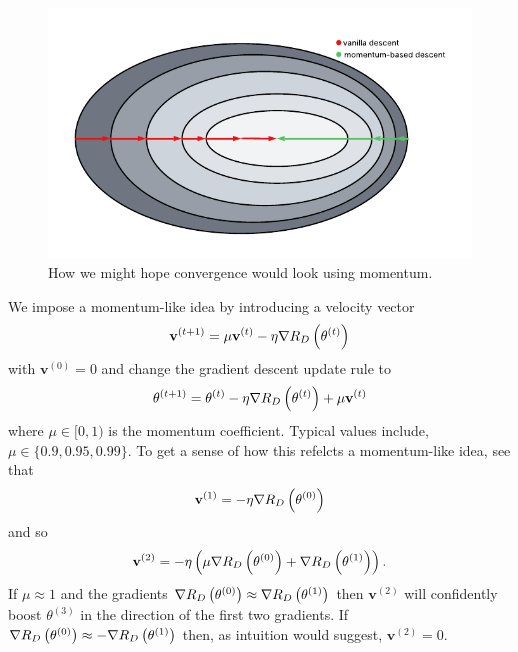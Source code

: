 \documentclass[11pt]{article}
\begin{document}
\begin{figure}[t]
    \centering
    \begin{minipage}{0.62\linewidth}
        \includegraphics[width=\columnwidth]{./figures/gradient_descent/momentum.pdf}
    \end{minipage}%
    \hfill
    \begin{minipage}{0.38\linewidth}
        \caption{How we might hope convergence would look using momentum.}
        \label{fig:gradient_descent_momentum}
    \end{minipage}
\end{figure}

We impose a momentum-like idea by introducing a velocity vector
$$
\mathbf{v}^{(t+1)}
=
\mu\mathbf{v}^{(t)}-\eta\nabla R_D\left(\theta^{(t)}\right)
$$
with $\mathbf{v}^{(0)}=0$ and change the gradient descent update rule to
$$
\theta^{(t+1)}
=
\theta^{(t)}-\eta\nabla R_D\left(\theta^{(t)}\right)+\mu\mathbf{v}^{(t)}
$$
where $\mu\in[0,1)$ is the momentum coefficient. Typical values include, $\mu\in\{0.9,0.95,0.99\}$. To get a sense of how this refelcts a momentum-like idea, see that
$$
\mathbf{v}^{(1)}
=
-\eta\nabla R_D\left(\theta^{(0)}\right)
$$
and so
$$
\mathbf{v}^{(2)}
=
-\eta\left(\mu\nabla R_D\left(\theta^{(0)}\right)+\nabla R_D\left(\theta^{(1)}\right)\right).
$$
If $\mu\approx1$ and the gradients $\nabla R_D\left(\theta^{(0)}\right)\approx\nabla R_D\left(\theta^{(1)}\right)$ then $\mathbf{v}^{(2)}$ will confidently boost $\theta^{(3)}$ in the direction of the first two gradients. If $\nabla R_D\left(\theta^{(0)}\right)\approx-\nabla R_D\left(\theta^{(1)}\right)$ then, as intuition would suggest, $\mathbf{v}^{(2)}=0$.
\end{document}
